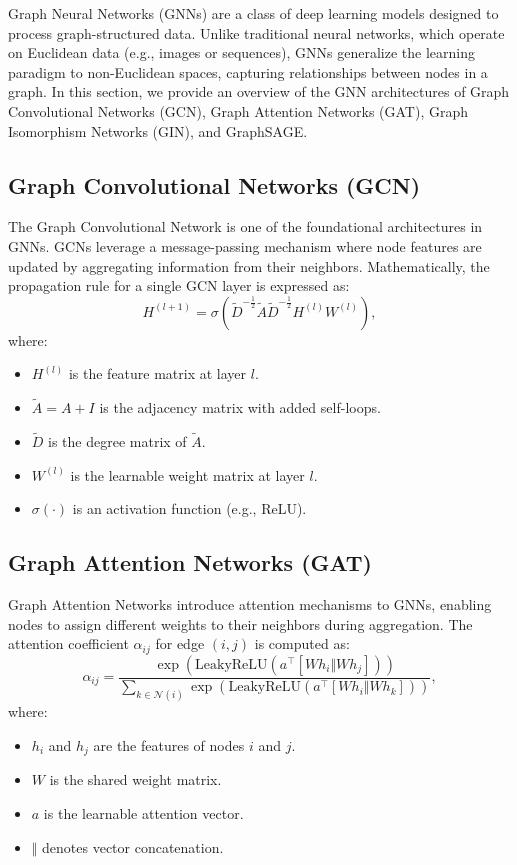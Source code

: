 Graph Neural Networks (GNNs) are a class of deep learning models designed to process graph-structured data. Unlike traditional neural networks, which operate on Euclidean data (e.g., images or sequences), GNNs generalize the learning paradigm to non-Euclidean spaces, capturing relationships between nodes in a graph. In this section, we provide an overview of the GNN architectures of Graph Convolutional Networks (GCN), Graph Attention Networks (GAT), Graph Isomorphism Networks (GIN), and GraphSAGE.

\subsection{Graph Convolutional Networks (GCN)}

The Graph Convolutional Network \cite{kipf2017semi} is one of the foundational architectures in GNNs. GCNs leverage a message-passing mechanism where node features are updated by aggregating information from their neighbors. Mathematically, the propagation rule for a single GCN layer is expressed as:
\begin{equation}
H^{(l+1)} = \sigma(\tilde{D}^{-\frac{1}{2}} \tilde{A} \tilde{D}^{-\frac{1}{2}} H^{(l)} W^{(l)}),
\end{equation}
where:
\begin{itemize}
	\item $H^{(l)}$ is the feature matrix at layer $l$.
	\item $\tilde{A} = A + I$ is the adjacency matrix with added self-loops.
	\item $\tilde{D}$ is the degree matrix of $\tilde{A}$.
	\item $W^{(l)}$ is the learnable weight matrix at layer $l$.
	\item $\sigma(\cdot)$ is an activation function (e.g., ReLU).
\end{itemize}


\bigskip
\subsection{Graph Attention Networks (GAT)}

Graph Attention Networks \cite{velickovic2018graph} introduce attention mechanisms to GNNs, enabling nodes to assign different weights to their neighbors during aggregation. The attention coefficient $\alpha_{ij}$ for edge $(i, j)$ is computed as:
\begin{equation}
\alpha_{ij} = \frac{\exp(\text{LeakyReLU}(a^{\top} [W h_i \Vert W h_j]))}{\sum_{k \in \mathcal{N}(i)} \exp(\text{LeakyReLU}(a^{\top} [W h_i \Vert W h_k]))},
\end{equation}
where:
\begin{itemize}
	\item $h_i$ and $h_j$ are the features of nodes $i$ and $j$.
	\item $W$ is the shared weight matrix.
	\item $a$ is the learnable attention vector.
	\item $\Vert$ denotes vector concatenation.
\end{itemize}

